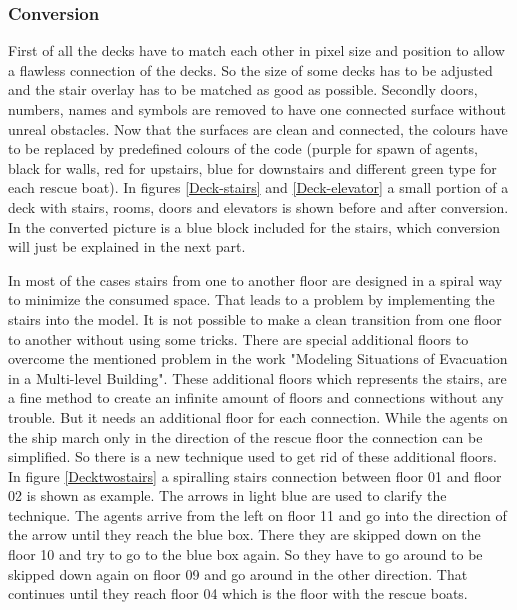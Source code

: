 \documentclass[11pt]{article}
\begin{document}
\subsubsection{Conversion}
First of all the decks have to match each other in pixel size and position to allow a flawless connection of the decks. So the size of some decks has to be adjusted and the stair overlay has to be matched as good as possible.
Secondly doors, numbers, names and symbols are removed to have one connected surface without unreal obstacles.
\newline
Now that the surfaces are clean and connected, the colours have to be replaced by predefined colours of the code (purple for spawn of agents, black for walls, red for upstairs, blue for downstairs and different green type for each rescue boat).
\newline
In figures \ref{Deck-stairs} and \ref{Deck-elevator} a small portion of a deck with stairs, rooms, doors and elevators is shown before and after conversion. In the converted picture is a blue block included for the stairs, which conversion will just be explained in the next part.
%

In most of the cases stairs from one to another floor are designed in a spiral way to minimize the consumed space. That leads to a problem by implementing the stairs into the model. It is not possible to make a clean transition from one floor to another without using some tricks.
\newline
There are special additional floors to overcome the mentioned problem in the work "Modeling Situations of Evacuation in a Multi-level Building"\cite{Building}. These additional floors which represents the stairs, are a fine method to create an infinite amount of floors and connections without any trouble. But it needs an additional floor for each connection.
\newline
While the agents on the ship march only in the direction of the rescue floor the connection can be simplified. So there is a new technique used to get rid of these additional floors.
\newline
In figure \ref{Decktwostairs} a spiralling stairs connection between floor 01 and floor 02 is shown as example. The arrows in light blue are used to clarify the technique.
\newline
The agents arrive from the left on floor 11 and go into the direction of the arrow until they reach the blue box. There they are skipped down on  the floor 10 and try to go to the blue box again. So they have to go around to be skipped down again on floor 09 and go around in the other direction. That continues until they reach floor 04 which is the floor with the rescue boats.
\end{document}
